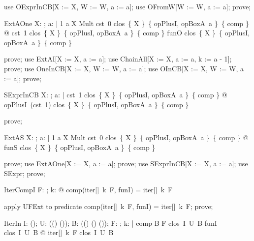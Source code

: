 \documentclass{article}
\begin{document}
\begin{zproof}
use OExprInCB[X := X, W := W, a := a];
use OFromW[W := W, a := a];
prove;
\end{zproof}

\begin{theorem}{ExtAOne}
  \forall X: \nat \fun \nat; a: \nat | 1 \leq a \land X \in Mult \land cst~0 \in clos~\{ X \}~\{ opPlusI, opBoxA~a \}~\{ comp \} @
    cst~1 \in clos~\{ X \}~\{ opPlusI, opBoxA~a \}~\{ comp \} \land funO \in clos~\{ X \}~\{ opPlusI, opBoxA~a \}~\{ comp \}
\end{theorem}

\begin{zproof}
prove;
use ExtAI[X := X, a := a];
use ChainAll[X := X, a := a, k := a - 1];
prove;
use OneInCB[X := X, W := W, a := a];
use OInCB[X := X, W := W, a := a];
prove;
\end{zproof}

\begin{theorem}{SExprInCB}
  \forall X: \nat \fun \nat; a: \nat | cst~1 \in clos~\{ X \}~\{ opPlusI, opBoxA~a \}~\{ comp \} @ opPlusI~(cst~1) \in clos~\{ X \}~\{ opPlusI, opBoxA~a \}~\{ comp \}
\end{theorem}

\begin{zproof}
prove;
\end{zproof}

\begin{theorem}{ExtAS}
  \forall X: \nat \fun \nat; a: \nat | 1 \leq a \land X \in Mult \land cst~0 \in clos~\{ X \}~\{ opPlusI, opBoxA~a \}~\{ comp \} @ funS \in clos~\{ X \}~\{ opPlusI, opBoxA~a \}~\{ comp \}
\end{theorem}

\begin{zproof}
prove;
use ExtAOne[X := X, a := a];
prove;
use SExprInCB[X := X, a := a];
use SExpr;
prove;
\end{zproof}

\begin{theorem}{IterCompI}
  \forall F: \nat \fun \nat; k: \nat @ comp(iter[\nat]~k~F, funI) = iter[\nat]~k~F
\end{theorem}

\begin{zproof}
apply UFExt to predicate comp(iter[\nat]~k~F, funI) = iter[\nat]~k~F;
prove;
\end{zproof}

\begin{theorem}{IterIn}
  \forall I: \power (\nat \fun \nat); U: \power ((\nat \fun \nat) \fun (\nat \fun \nat)); B: \power ((\nat \fun \nat) \cross (\nat \fun \nat) \fun (\nat \fun \nat)); F: \nat \fun \nat; k: \nat |
    comp \in B \land F \in clos~I~U~B \land funI \in clos~I~U~B @ iter[\nat]~k~F \in clos~I~U~B
\end{theorem}
\end{document}
